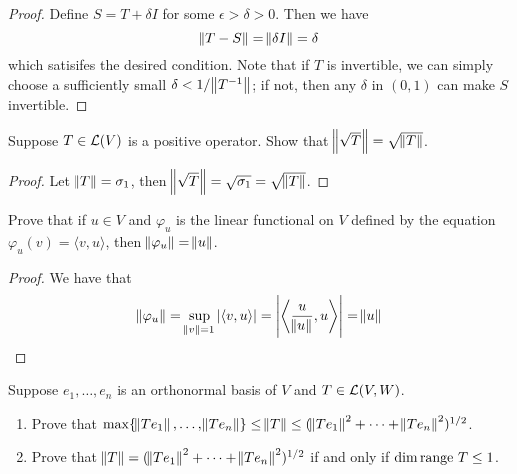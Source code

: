 \documentclass{extarticle}
\begin{document}
\begin{proof}
Define \(S = T + \delta I\) for some \(\epsilon > \delta > 0\). Then we 
have 
\[\norm{T - S} = \norm{\delta I} = \delta \]
which satisifes the desired condition. Note that if \(T\) is invertible, we can 
simply choose a sufficiently small \(\delta < 1/\norm{T^{-1}}\); if not, then any 
\(\delta\) in \((0, 1)\) can make \(S\) invertible. 
\end{proof}

\begin{problem}{12}
    Suppose \(T \in \mathcal{L}(V)\) is a positive operator. Show 
    that \(\norm{\sqrt{T}} = \sqrt{\norm{T}}\). 
\end{problem}

\begin{proof}
Let \(\norm{T} = \sigma_1\), then \(\norm{\sqrt{T}} 
= \sqrt{\sigma_1} = \sqrt{\norm{T}}\). 
\end{proof}

\begin{problem}{17}
    Prove that if \(u \in V\) and \(\varphi_u\) is the linear functional on \(V\) defined 
    by the equation \(\varphi_u(v) = \langle v,u \rangle\), then \(\norm{\varphi_u} = \norm{u}\).
\end{problem}

\begin{proof}
We have that 
\[\norm{\varphi_u} = \sup_{\norm{v} = 1} |\langle v,u \rangle| = \left|\left\langle \frac{u}{\norm{u}},u \right\rangle \right| = \norm{u}\]
\end{proof}

\begin{problem}{18}
    Suppose \(e_1, \ldots, e_n\) is an orthonormal basis of \(V\) and \(T \in \mathcal{L}(V, W)\). 
    \begin{enumerate}[label=(\alph*)]
        \item Prove that \(\max\{\norm{Te_1}, \ldots, \norm{Te_n}\}\leq \norm{T} \leq (\norm{Te_1}^2 + \cdots + \norm{Te_n}^2)^{1/2}\).
        \item Prove that \(\norm{T} = (\norm{T e_1}^2 + \cdots + \norm{Te_n}^2)^{1/2}\) if and only 
        if \(\dim \text{range } T \leq 1\).
    \end{enumerate}
\end{problem}
\end{document}
